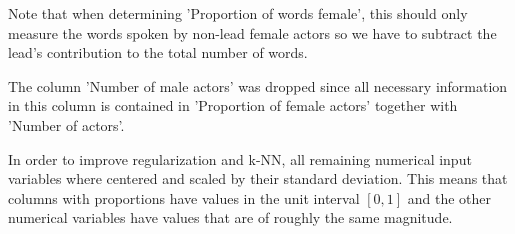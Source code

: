 \documentclass[../../project.tex]{subfiles}
\begin{document}
	Note that when determining 'Proportion of words female', this should only measure the words spoken by non-lead female actors so we have to subtract the lead's contribution to the total number of words.
	
	The column 'Number of male actors' was dropped since all necessary information in this column is contained in 'Proportion of female actors' together with 'Number of actors'.
	
	In order to improve regularization and k-NN, all remaining numerical input variables where centered and scaled by their standard deviation. This means that columns with proportions have values in the unit interval $[0,1]$ and the other numerical variables have values that are of roughly the same magnitude.
\end{document}
